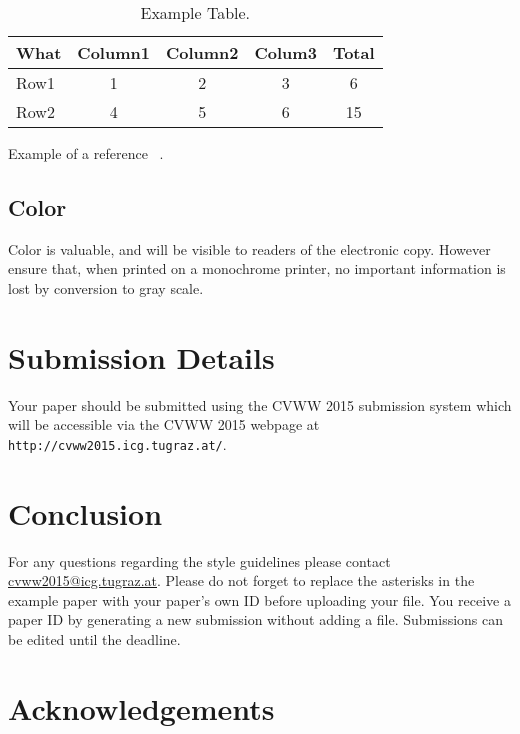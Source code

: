 \documentclass[11pt,twoside,twocolumn,a4paper]{article}
\begin{document}
\begin{table}
  \begin{center}
    \begin{tabular}{l | c c c | c}
        What      & Column1 & Column2 & Colum3 & Total\\ \hline\hline
      Row1        &  1  & 2     & 3 & 6 \\
      Row2 &   4  & 5     & 6 & 15 \\
    \end{tabular}
  \end{center}
  \caption{Example Table.}
  \label{tab:detail}
\end{table}

Example of a reference ~\cite{Authors06}.
\subsection{Color}
Color is valuable, and will be visible to readers of the electronic copy. However ensure that, when printed on a monochrome printer, no important information is lost by conversion to gray scale.

\section{Submission Details}
Your paper should be submitted using the CVWW 2015 submission system which will be accessible via the CVWW 2015 webpage at
\texttt{http://cvww2015.icg.tugraz.at/}.


\section{Conclusion}
For any questions regarding the style guidelines please contact \href{mailto:cvww2015@icg.tugraz.at}{cvww2015@icg.tugraz.at}.
Please do not forget to replace the asterisks in the example paper with your paper's own ID before uploading your file.
You receive a paper ID by generating a new submission without adding a file.
Submissions can be edited until the deadline.

\section*{Acknowledgements}


{\small


}
\end{document}

